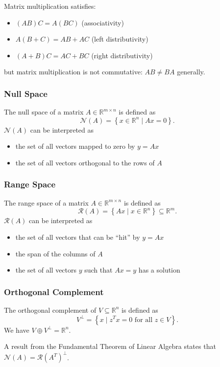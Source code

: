 \documentclass[11pt]{article}
\begin{document}
Matrix multiplication satisfies:
\begin{itemize}
    \item $(AB)C = A(BC)$ (associativity)
    \item $A(B+C) = AB + AC$ (left distributivity)
    \item $(A+B)C = AC + BC$ (right distributivity)
\end{itemize}
but matrix multiplication is not commutative: $AB \neq BA$ generally. \par 

\subsubsection*{Null Space}
The null space of a matrix $A \in \mathbb{R}^{m\times n}$ is defined as 
\[ \mathcal{N}(A) = \left\{ x \in \mathbb{R}^n \mid Ax = 0 \right\}. \] 
$\mathcal{N}(A)$ can be interpreted as
\begin{itemize}
    \item the set of all vectors mapped to zero by $y = Ax$
    \item the set of all vectors orthogonal to the rows of $A$
\end{itemize}
\subsubsection*{Range Space} 
The range space of a matrix $A \in \mathbb{R}^{m\times n}$ is defined as 
\[ \mathcal{R}(A) = \left\{ Ax \mid x \in \mathbb{R}^n \right\} \subseteq \mathbb{R}^m. \] 
$\mathcal{R}(A)$ can be interpreted as 
\begin{itemize}
    \item the set of all vectors that can be ``hit'' by $y = Ax$
    \item the span of the columns of $A$
    \item the set of all vectors $y$ such that $Ax = y$ has a solution
\end{itemize}

\subsubsection*{Orthogonal Complement}
The orthogonal complement of $V \subseteq \mathbb{R}^n$ is defined as 
\[ V^\perp = \left\{ x \mid z^Tx = 0 \text{ for all }  z\in V \right\}. \] 
We have $V \oplus V^\perp = \mathbb{R}^n$. \par

A result from the Fundamental Theorem of Linear Algebra states that $\mathcal{N}(A) = \mathcal{R}(A^T)^\perp$.
\end{document}
